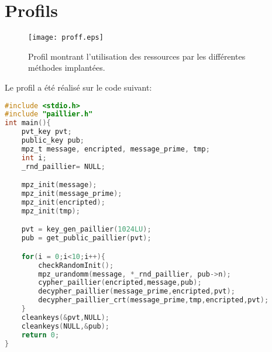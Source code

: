 \chapter{Profils}
\begin{figure}[hlc]
	\center

	\texttt{[image: proff.eps]}
	
	\caption{Profil montrant l'utilisation des ressources par les différentes méthodes implantées.} 
\end{figure}

Le profil a été réalisé sur le code suivant:
\begin{lstlisting}[language=C,emph={},caption=Code du test de profil., label=code:profil]
#include <stdio.h>
#include "paillier.h"
int main(){
	pvt_key pvt;
	public_key pub;
	mpz_t message, encripted, message_prime, tmp;
	int i;
	_rnd_paillier= NULL;

	mpz_init(message);
	mpz_init(message_prime);
	mpz_init(encripted);
	mpz_init(tmp);

	pvt = key_gen_paillier(1024LU);
	pub = get_public_paillier(pvt);

	for(i = 0;i<10;i++){
		checkRandomInit();
		mpz_urandomm(message, *_rnd_paillier, pub->n);
		cypher_paillier(encripted,message,pub);
		decypher_paillier(message_prime,encripted,pvt);
		decypher_paillier_crt(message_prime,tmp,encripted,pvt);
	}
	cleankeys(&pvt,NULL);
	cleankeys(NULL,&pub);
	return 0;
}
\end{lstlisting}
